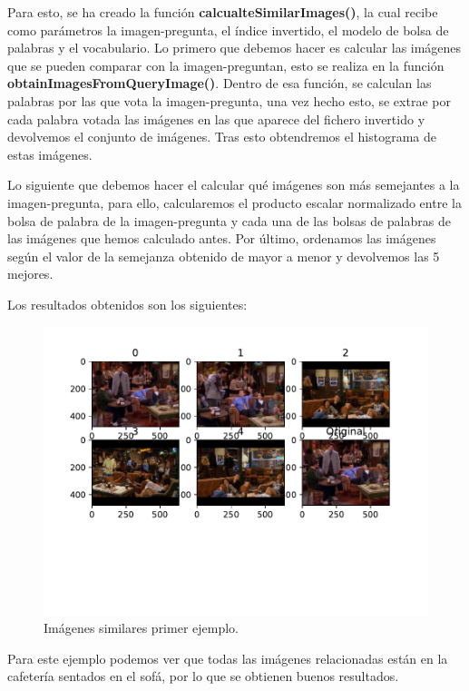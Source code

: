 	\vspace{0.06in}
	Para esto, se ha creado la función \textbf{calcualteSimilarImages()}, la cual recibe como parámetros la imagen-pregunta, el índice invertido, el modelo de bolsa de palabras y el vocabulario. Lo primero que debemos hacer es calcular las imágenes que se pueden comparar con la imagen-preguntan, esto se realiza en la función \textbf{obtainImagesFromQueryImage()}. Dentro de esa función, se calculan las palabras por las que vota la imagen-pregunta, una vez hecho esto, se extrae por cada palabra votada las imágenes en las que aparece del fichero invertido y devolvemos el conjunto de imágenes.
	Tras esto obtendremos el histograma de estas imágenes.
	
	\vspace{0.06in}
	Lo siguiente que debemos hacer el calcular qué imágenes son más semejantes a la imagen-pregunta, para ello, calcularemos el producto escalar normalizado entre la bolsa de palabra de la imagen-pregunta y cada una de las bolsas de palabras de las imágenes que hemos calculado antes. Por último, ordenamos las imágenes según el valor de la semejanza obtenido de mayor a menor y devolvemos las 5 mejores.
	
	\vspace{0.06in}
	Los resultados obtenidos son los siguientes:
	\begin{figure}[H]
		\centering
		\includegraphics[scale=0.6]{./imagenes/eje3_1.pdf}
		\caption{Imágenes similares primer ejemplo.}
		\label{fig:eje3_1}
	\end{figure}
	
	\vspace{0.06in}
	Para este ejemplo podemos ver que todas las imágenes relacionadas están en la cafetería sentados en el sofá, por lo que se obtienen buenos resultados.

